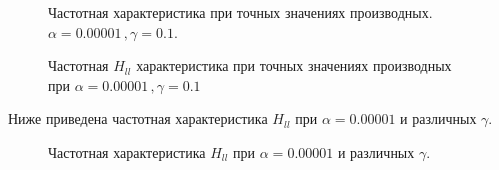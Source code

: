 \documentclass{article}
\begin{document}
\begin{figure}[H]
\caption{Частотная характеристика при точных значениях производных. $\alpha = 0.00001\,,\gamma = 0.1$.}
\label{ris:cont_plt}
\end{figure}
\begin{figure}[H]
\caption{Частотная $H_{ll}$ характеристика при точных значениях производных при $\alpha = 0.00001\,,\gamma = 0.1$}
\end{figure}

Ниже приведена частотная характеристика $H_{ll}$ при $\alpha = 0.00001$ и различных $\gamma$.
\begin{figure}[H]
\caption{Частотная характеристика $H_{ll}$ при $\alpha = 0.00001$ и различных $\gamma$.}
\end{figure}
\end{document}
